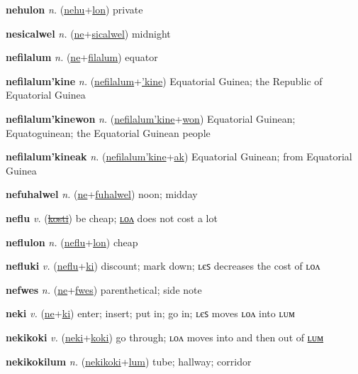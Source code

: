 \textbf{\hypertarget{nehulon}{nehulon}} \textit{n.} (\hyperlink{nehu}{nehu}+\allowbreak \hyperlink{lon}{lon})
private

\textbf{\hypertarget{nesicalwel}{nesicalwel}} \textit{n.} (\hyperlink{ne}{ne}+\allowbreak \hyperlink{sicalwel}{sicalwel})
midnight

\textbf{\hypertarget{nefilalum}{nefilalum}} \textit{n.} (\hyperlink{ne}{ne}+\allowbreak \hyperlink{filalum}{filalum})
equator

\textbf{\hypertarget{nefilalum'kine}{nefilalum'kine}} \textit{n.} (\hyperlink{nefilalum}{nefilalum}+\allowbreak \hyperlink{'kine}{'kine})
Equatorial Guinea; the Republic of Equatorial Guinea

\textbf{\hypertarget{nefilalum'kinewon}{nefilalum'kinewon}} \textit{n.} (\hyperlink{nefilalum'kine}{nefilalum'kine}+\allowbreak \hyperlink{won}{won})
Equatorial Guinean; Equatoguinean; the Equatorial Guinean people

\textbf{\hypertarget{nefilalum'kineak}{nefilalum'kineak}} \textit{n.} (\hyperlink{nefilalum'kine}{nefilalum'kine}+\allowbreak \hyperlink{ak}{ak})
Equatorial Guinean; from Equatorial Guinea

\textbf{\hypertarget{nefuhalwel}{nefuhalwel}} \textit{n.} (\hyperlink{ne}{ne}+\allowbreak \hyperlink{fuhalwel}{fuhalwel})
noon; midday

\textbf{\hypertarget{neflu}{neflu}} \textit{v.} (\hyperlink{kosti}{\sout{kosti}})
be cheap; \hyperlink{neflulon}{ʟᴏᴧ} does not cost a lot

\textbf{\hypertarget{neflulon}{neflulon}} \textit{n.} (\hyperlink{neflu}{neflu}+\allowbreak \hyperlink{lon}{lon})
cheap

\textbf{\hypertarget{nefluki}{nefluki}} \textit{v.} (\hyperlink{neflu}{neflu}+\allowbreak \hyperlink{ki}{ki})
discount; mark down; ʟєꜱ decreases the cost of ʟᴏᴧ

\textbf{\hypertarget{nefwes}{nefwes}} \textit{n.} (\hyperlink{ne}{ne}+\allowbreak \hyperlink{fwes}{fwes})
parenthetical; side note

\textbf{\hypertarget{neki}{neki}} \textit{v.} (\hyperlink{ne}{ne}+\allowbreak \hyperlink{ki}{ki})
enter; insert; put in; go in; ʟєꜱ moves ʟᴏᴧ into ʟᴜᴍ

\textbf{\hypertarget{nekikoki}{nekikoki}} \textit{v.} (\hyperlink{neki}{neki}+\allowbreak \hyperlink{koki}{koki})
go through; ʟᴏᴧ moves into and then out of \hyperlink{nekikokilum}{ʟᴜᴍ}

\textbf{\hypertarget{nekikokilum}{nekikokilum}} \textit{n.} (\hyperlink{nekikoki}{nekikoki}+\allowbreak \hyperlink{lum}{lum})
tube; hallway; corridor

